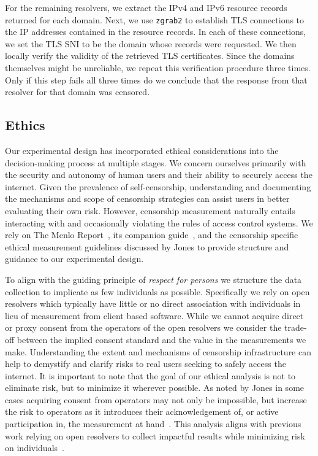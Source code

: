 For the remaining resolvers, we extract the IPv4 and IPv6 resource records
returned for each domain. Next, we use \texttt{zgrab2} to establish TLS
connections to the IP addresses contained in the resource records. In each of
these connections, we set the TLS SNI to be the domain whose records were
requested. We then locally verify the validity of the retrieved TLS
certificates.
%
Since the domains themselves might be unreliable, we repeat this verification
procedure three times. Only if this step fails all three times do we conclude
that the response from that resolver for that domain was censored. 

\subsection{Ethics}\label{sec:methodology:ethics}
Our experimental design has incorporated ethical considerations into the
decision-making process at multiple stages. We concern ourselves primarily with
the security and autonomy of human users and their ability to securely access
the internet. Given the prevalence of self-censorship, understanding and
documenting the mechanisms and scope of censorship strategies can assist users
in better evaluating their own risk. However, censorship measurement naturally
entails interacting with and occasionally violating the rules of access control
systems. We rely on The Menlo Report~\cite{menlo}, its companion
guide~\cite{menlo-companion}, and the censorship specific ethical measurement
guidelines discussed by Jones \etal \cite{jones2015ethical} to provide
structure and guidance to our experimental design.

To align with the guiding principle of \textit{respect for persons} we
structure the data collection to implicate as few individuals as possible.
Specifically we rely on open resolvers which typically have little or no direct
association with individuals in lieu of measurement from client based
software. While we cannot acquire direct or proxy consent from the operators of
the open resolvers we consider the trade-off between the implied consent
standard and the value in the measurements we make. Understanding the extent
and mechanisms of censorship infrastructure can help to demystify and clarify
risks to real users seeking to safely access the internet. It is important to
note that the goal of our ethical analysis is not to eliminate risk, but to
minimize it wherever possible. As noted by Jones \etal in some cases acquiring
consent from operators may not only be impossible, but increase the risk to
operators as it introduces their acknowledgement of, or active participation
in, the measurement at hand~\cite{jones2015ethical}. This analysis aligns with
previous work relying on open resolvers to collect impactful results while
minimizing risk on
individuals~\cite{pearce2017global,scott2016satellite,sundara2020censored}.


